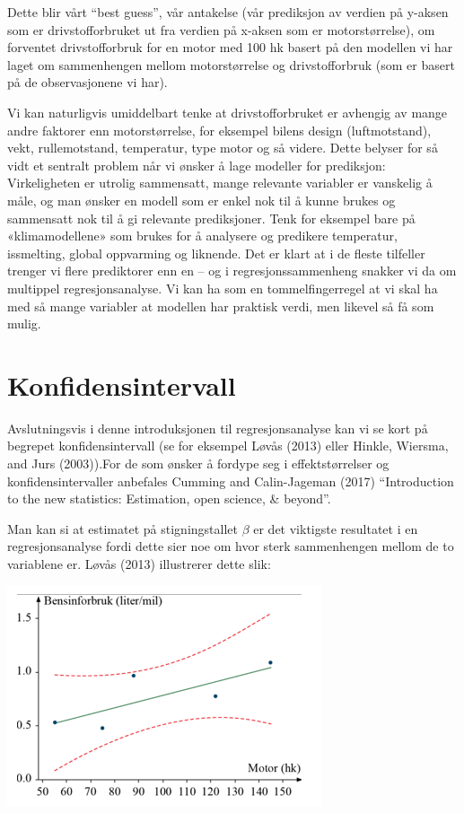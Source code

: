 \documentclass[
]{article}
\begin{document}
Dette blir vårt ``best guess'', vår antakelse (vår prediksjon av verdien
på y-aksen som er drivstofforbruket ut fra verdien på x-aksen som er
motorstørrelse), om forventet drivstofforbruk for en motor med 100 hk
basert på den modellen vi har laget om sammenhengen mellom
motorstørrelse og drivstofforbruk (som er basert på de observasjonene vi
har).

Vi kan naturligvis umiddelbart tenke at drivstofforbruket er avhengig av
mange andre faktorer enn motorstørrelse, for eksempel bilens design
(luftmotstand), vekt, rullemotstand, temperatur, type motor og så
videre. Dette belyser for så vidt et sentralt problem når vi ønsker å
lage modeller for prediksjon: Virkeligheten er utrolig sammensatt, mange
relevante variabler er vanskelig å måle, og man ønsker en modell som er
enkel nok til å kunne brukes og sammensatt nok til å gi relevante
prediksjoner. Tenk for eksempel bare på «klimamodellene» som brukes for
å analysere og predikere temperatur, issmelting, global oppvarming og
liknende. Det er klart at i de fleste tilfeller trenger vi flere
prediktorer enn en -- og i regresjonssammenheng snakker vi da om
multippel regresjonsanalyse. Vi kan ha som en tommelfingerregel at vi
skal ha med så mange variabler at modellen har praktisk verdi, men
likevel så få som mulig.

\hypertarget{konfidensintervall}{%
\section{Konfidensintervall}\label{konfidensintervall}}

Avslutningsvis i denne introduksjonen til regresjonsanalyse kan vi se
kort på begrepet konfidensintervall (se for eksempel Løvås (2013) eller
Hinkle, Wiersma, and Jurs (2003)).For de som ønsker å fordype seg i
effektstørrelser og konfidensintervaller anbefales Cumming and
Calin-Jageman (2017) ``Introduction to the new statistics: Estimation,
open science, \& beyond''.

Man kan si at estimatet på stigningstallet \(\beta\) er det viktigste
resultatet i en regresjonsanalyse fordi dette sier noe om hvor sterk
sammenhengen mellom de to variablene er. Løvås (2013) illustrerer dette
slik:

\includegraphics{Teori_fig5.png}
\end{document}
